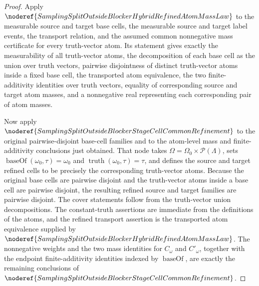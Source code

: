\begin{proof}
Apply \(\noderef{SamplingSplitOutsideBlockerHybridRefinedAtomMassLaw}\) to
the measurable source and target base cells, the measurable source and target
label events, the transport relation, and the assumed common nonnegative mass
certificate for every truth-vector atom.  Its statement gives exactly the
measurability of all truth-vector atoms, the decomposition of each base cell
as the union over truth vectors, pairwise disjointness of distinct truth-vector
atoms inside a fixed base cell, the transported atom equivalence, the two
finite-additivity identities over truth vectors, equality of corresponding
source and target atom masses, and a nonnegative real representing each
corresponding pair of atom masses.

Now apply \(\noderef{SamplingSplitOutsideBlockerStageCellCommonRefinement}\)
to the original pairwise-disjoint base-cell families and to the atom-level
mass and finite-additivity conclusions just obtained.  That node takes
\(\Omega=\Omega_0\times\mathcal P(\Lambda)\), sets
\(\operatorname{baseOf}(\omega_0,\tau)=\omega_0\) and
\(\operatorname{truth}(\omega_0,\tau)=\tau\), and defines the source and
target refined cells to be precisely the corresponding truth-vector atoms.
Because the original base cells are pairwise disjoint and the truth-vector
atoms inside a base cell are pairwise disjoint, the resulting refined source
and target families are pairwise disjoint.  The cover statements follow from
the truth-vector union decompositions.  The constant-truth assertions are
immediate from the definitions of the atoms, and the refined transport
assertion is the transported atom equivalence supplied by
\(\noderef{SamplingSplitOutsideBlockerHybridRefinedAtomMassLaw}\).  The
nonnegative weights and the two mass identities for \(C_\omega\) and
\(C'_\omega\), together with the endpoint finite-additivity identities indexed
by \(\operatorname{baseOf}\), are exactly the remaining conclusions of
\(\noderef{SamplingSplitOutsideBlockerStageCellCommonRefinement}\).
\end{proof}
